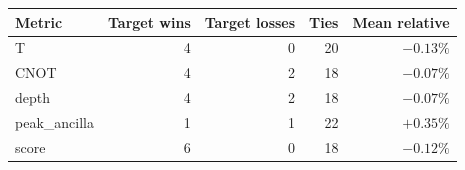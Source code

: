 \begin{tabular}{lrrrr}
\toprule
Metric & Target wins & Target losses & Ties & Mean relative \\
\midrule
T & 4 & 0 & 20 & $-0.13\%$ \\
CNOT & 4 & 2 & 18 & $-0.07\%$ \\
depth & 4 & 2 & 18 & $-0.07\%$ \\
peak_ancilla & 1 & 1 & 22 & $+0.35\%$ \\
score & 6 & 0 & 18 & $-0.12\%$ \\
\bottomrule
\end{tabular}
